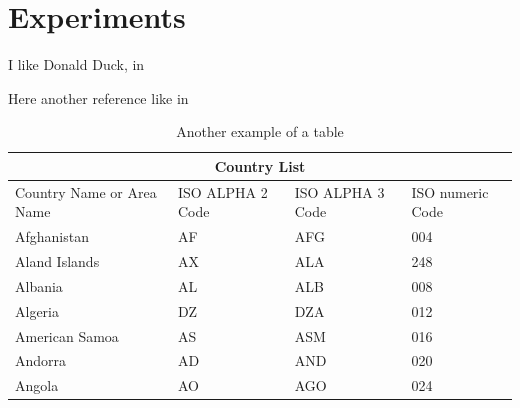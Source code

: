 \section{Experiments}

I like Donald Duck, in \cite{leal2018web}

Here another reference like in \cite*{leal2018web}

\begin{table}
 \caption{Another example of a table}\label{tab:2}
\begin{tabular}{ |p{3cm}||p{3cm}|p{3cm}|p{3cm}|  }
 \hline
 \multicolumn{4}{|c|}{Country List} \\
 \hline
 Country Name     or Area Name& ISO ALPHA 2 Code &ISO ALPHA 3 Code&ISO numeric Code\\
 \hline
 Afghanistan   & AF    &AFG&   004\\
 Aland Islands&   AX  & ALA   &248\\
 Albania &AL & ALB&  008\\
 Algeria    &DZ & DZA&  012\\
 American Samoa&   AS  & ASM&016\\
 Andorra& AD  & AND   &020\\
 Angola& AO  & AGO&024\\
 \hline
\end{tabular}
\end{table}